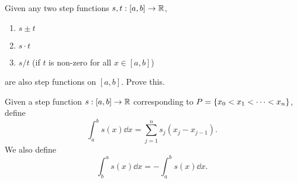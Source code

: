 \begin{rem}
    Given any two step functions $s, t : [a, b] \to \mathbb{R}$,
    \begin{enumerate}[label=(\alph*)]
        \item $s \pm t$
        \item $s \cdot t$
        \item $s / t$ (if $t$ is non-zero for all $x \in [a, b]$)
    \end{enumerate}
    are also step functions on $[a, b]$. \textcolor{red!70!black}{Prove this}.
\end{rem}

\begin{defn} \label{defn:step int}
    Given a step function $s : [a, b] \to \mathbb{R}$ corresponding to $P = \set{x_{0} < x_{1} < \dots < x_{n}}$, define \[
        \int_{a}^{b} s(x) \dd x = \sum_{j=1}^{n} s_{j} (x_{j} - x_{j-1}).
    \] We also define \[
        \int_{b}^{a} s(x) \dd x = - \int_{a}^{b} s(x) \dd x.
    \]
\end{defn}
